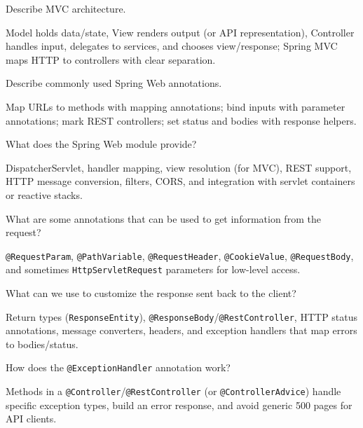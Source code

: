 \newpage


\question[4]
Describe MVC architecture.
\makeemptybox{1.35in}
\begin{solution}
  Model holds data/state, View renders output (or API representation), Controller handles input, delegates to services, and chooses view/response; Spring MVC maps HTTP to controllers with clear separation.
\end{solution}

\question[4]
Describe commonly used Spring Web annotations.
\makeemptybox{1.55in}
\begin{solution}
  Map URLs to methods with mapping annotations; bind inputs with parameter annotations; mark REST controllers; set status and bodies with response helpers.
\end{solution}

\question[4]
What does the Spring Web module provide?
\makeemptybox{1.2in}
\begin{solution}
  DispatcherServlet, handler mapping, view resolution (for MVC), REST support, HTTP message conversion, filters, CORS, and integration with servlet containers or reactive stacks.
\end{solution}

\question[4]
What are some annotations that can be used to get information from the request?
\makeemptybox{1.35in}
\begin{solution}
  \texttt{@RequestParam}, \texttt{@PathVariable}, \texttt{@RequestHeader}, \texttt{@CookieValue}, \texttt{@RequestBody}, and sometimes \texttt{HttpServletRequest} parameters for low-level access.
\end{solution}

\question[4]
What can we use to customize the response sent back to the client?
\makeemptybox{1.25in}
\begin{solution}
  Return types (\texttt{ResponseEntity}), \texttt{@ResponseBody}/\texttt{@RestController}, HTTP status annotations, message converters, headers, and exception handlers that map errors to bodies/status.
\end{solution}

\question[4]
How does the \texttt{@ExceptionHandler} annotation work?
\makeemptybox{1.3in}
\begin{solution}
  Methods in a \texttt{@Controller}/\texttt{@RestController} (or \texttt{@ControllerAdvice}) handle specific exception types, build an error response, and avoid generic 500 pages for API clients.
\end{solution}

